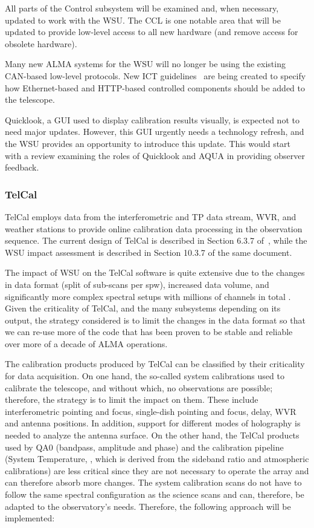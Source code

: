 All parts of the Control subsystem will be examined and, when necessary, updated to work with the WSU. The \ac{CCL} is one notable area that will be updated to provide low-level access to all new hardware (and remove access for obsolete hardware).

Many new ALMA systems for the WSU will no longer be using the existing \ac{CAN}-based low-level protocols. New \ac{ICT} guide\-lines~\cite{ict_mc_guidelines} are being created to specify how Ethernet-based and HTTP-based controlled components should be added to the telescope.

Quicklook, a GUI used to display calibration results visually, is expected not to need major updates. However, this GUI urgently needs a technology refresh, and the WSU provides an opportunity to introduce this update. This would start with a review examining the roles of Quicklook and AQUA in providing observer feedback.

\subsubsection{TelCal}
\label{sec:TelCal}
TelCal employs data from the interferometric and \ac{TP} data stream, \ac{WVR}, and weather stations to provide online calibration data processing in the observation sequence. The current design of TelCal is described in Section 6.3.7 of~\cite{CSA-IA}, while the WSU impact assessment is described in Section 10.3.7 of the same document.

The impact of WSU on the TelCal software is quite extensive due to the changes in data format (split of sub-scans per \ac{spw}), increased data volume, and significantly more complex spectral setups with millions of channels in total \cite{sys_reqs}. Given the criticality of TelCal, and the many subsystems depending on its output, the strategy considered is to limit the changes in the data format so that we can re-use more of the code that has been proven to be stable and reliable over more of a decade of ALMA operations.

The calibration products produced by TelCal can be classified by their criticality for data acquisition. On one hand, the so-called system calibrations used to calibrate the telescope, and without which, no observations are possible; therefore, the  strategy is to limit the impact on them. These include interferometric pointing and focus, single-dish pointing and focus, delay, WVR and antenna positions. In addition, support for different modes of holography is needed to analyze the antenna surface. On the other hand, the TelCal products used by QA0 (bandpass, amplitude and phase) and the calibration pipeline (System Temperature, \Tsys, which is derived from the sideband ratio and atmospheric calibrations) are less critical since they are not necessary to operate the array and can therefore absorb more changes. The system calibration scans do not have to follow the same spectral configuration as the science scans and can, therefore, be adapted to the observatory's needs. Therefore, the following approach will be implemented:

